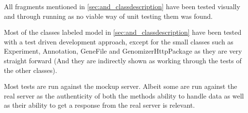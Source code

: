 All fragments mentioned in \ref{sec:and_classdescription} have been tested visually and through running as no viable way of unit testing them was found.

Most of the classes labeled model in \ref{sec:and_classdescription} have been tested with a test driven development approach, except for the small classes such as Experiment, Annotation, GeneFile and GenomizerHttpPackage as they are very straight forward (And they are indirectly shown as working through the tests of the other classes).

Most tests are run against the mockup server. Albeit some are run against the real server as the authenticity of both the methods ability to handle data as well as their ability to get a response from the real server is relevant.
